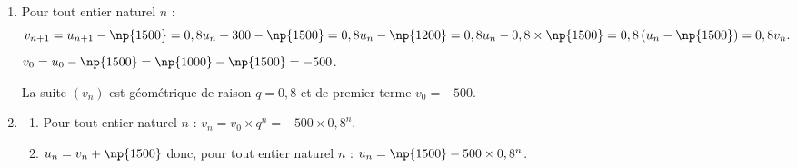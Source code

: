 \begin{enumerate}
	\item Pour tout entier naturel $n$ :
	\[v_{n+1} = u_{n+1} - \np{1500} = 0,8u_n + 300 - \np{1500} = 0,8u_n - \np{1200}
	= 0,8u_n - 0,8 \times \np{1500} = 0,8\left(u_n - \np{1500}\right) = 0,8v_n.\]
	$v_0 = u_0 - \np{1500} = \np{1000} - \np{1500} = -500$.

La suite $(v_n)$ est géométrique de raison $q = 0,8$ et de premier terme $v_0 = -500$.
	\item
	\begin{enumerate}
		\item Pour tout entier naturel $n$ : $v_n = v_0 \times q^n = -500 \times 0,8^n$.

		\item $u_n = v_n + \np{1500}$ donc, pour tout entier naturel $n$ : $u_n = \np{1500} - 500 \times 0,8^n$.
	\end{enumerate}
\end{enumerate}
